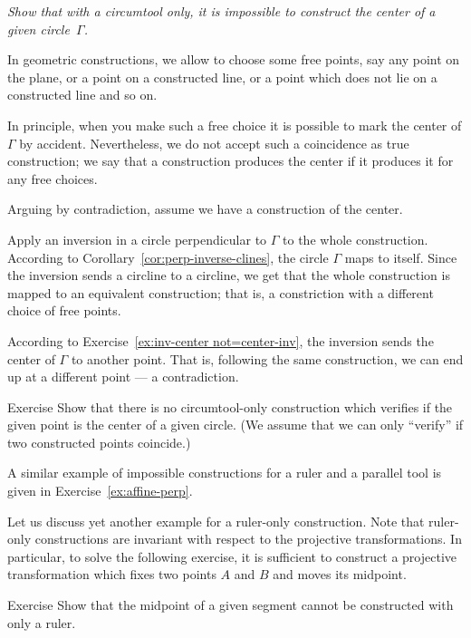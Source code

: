 \textit{Show that with a circumtool only,
it is impossible to construct the center of a given circle~$\Gamma$.}
\medskip

In geometric constructions, we allow to choose some free points,
say any point on the plane, or a point on a constructed line, or a point which does not lie on a constructed line and so on.

In principle, when you make such a free choice it is possible to mark the center of $\Gamma$ by accident.
Nevertheless, we do not accept such a coincidence as true construction; 
we say that a construction produces the center if it produces it for any free choices.


\label{page:solution-for-ex:circumtool}
Arguing by contradiction, 
assume we have a construction of the center. 

Apply an inversion in a circle perpendicular to $\Gamma$ to the whole construction.
According to Corollary~\ref{cor:perp-inverse-clines},
the circle
$\Gamma$ maps to itself.
Since the inversion sends a circline to a circline, we get that the whole  construction is mapped to an equivalent construction; 
that is, a constriction with a different choice of free points.

According to Exercise~\ref{ex:inv-center not=center-inv}, 
the inversion sends the center of $\Gamma$ to another point.
That is, following the same construction, we can end up at a different point --- a contradiction.
\qeds

\begin{thm}{Exercise}\label{ex:center-verify}
Show that there is no circumtool-only construction which verifies if the given point is the center of a given circle.
(We assume that we can only ``verify'' if two constructed points coincide.) 
\end{thm}

A similar example of impossible constructions for a ruler and a parallel tool
 is given in Exercise~\ref{ex:affine-perp}.
 
Let us discuss yet another example for a ruler-only construction.
Note that ruler-only constructions are invariant with respect to the projective transformations. 
In particular, to solve the following exercise, it is sufficient to construct a projective transformation which fixes two points $A$ and $B$ and moves its midpoint.

\begin{thm}{Exercise}\label{ex:midpoint-proj}
Show that the midpoint of a given segment cannot be constructed with only a ruler.
\end{thm}

